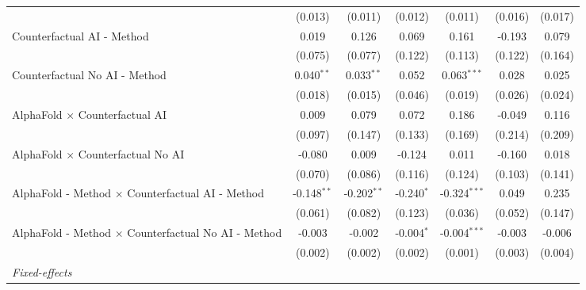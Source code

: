 \begin{tabular}{lcccccc}
                                                              & (0.013)       & (0.011)       & (0.012)       & (0.011)        & (0.016)       & (0.017)\\   
   Counterfactual AI - Method                                 & 0.019         & 0.126         & 0.069         & 0.161          & -0.193        & 0.079\\   
                                                              & (0.075)       & (0.077)       & (0.122)       & (0.113)        & (0.122)       & (0.164)\\   
   Counterfactual No AI - Method                              & 0.040$^{**}$  & 0.033$^{**}$  & 0.052         & 0.063$^{***}$  & 0.028         & 0.025\\   
                                                              & (0.018)       & (0.015)       & (0.046)       & (0.019)        & (0.026)       & (0.024)\\   
   AlphaFold $\times$ Counterfactual AI                       & 0.009         & 0.079         & 0.072         & 0.186          & -0.049        & 0.116\\   
                                                              & (0.097)       & (0.147)       & (0.133)       & (0.169)        & (0.214)       & (0.209)\\   
   AlphaFold $\times$ Counterfactual No AI                    & -0.080        & 0.009         & -0.124        & 0.011          & -0.160        & 0.018\\   
                                                              & (0.070)       & (0.086)       & (0.116)       & (0.124)        & (0.103)       & (0.141)\\   
   AlphaFold - Method $\times$ Counterfactual AI - Method     & -0.148$^{**}$ & -0.202$^{**}$ & -0.240$^{*}$  & -0.324$^{***}$ & 0.049         & 0.235\\   
                                                              & (0.061)       & (0.082)       & (0.123)       & (0.036)        & (0.052)       & (0.147)\\   
   AlphaFold - Method $\times$ Counterfactual No AI - Method  & -0.003        & -0.002        & -0.004$^{*}$  & -0.004$^{***}$ & -0.003        & -0.006\\   
                                                              & (0.002)       & (0.002)       & (0.002)       & (0.001)        & (0.003)       & (0.004)\\   
   \midrule
   \emph{Fixed-effects}\\

\end{tabular}
